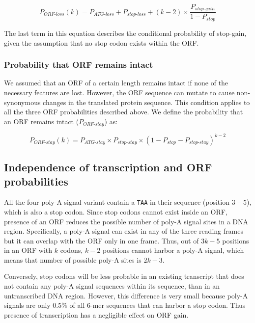 \documentclass[12pt,a4paper]{article}
\begin{document}
\begin{equation}
P_\textit{ORF-loss}(k) = P_\textit{ATG-loss} + P_\textit{stop-loss} + (k-2)\times \frac{P_\textit{stop-gain}}{1-P_\textit{stop}}
\label{eqorfloss}
\end{equation}

The last term in this equation describes the conditional probability of stop-gain, given the assumption that no stop codon exists within the ORF.

\subsubsection{Probability that ORF remains intact}

We assumed that an ORF of a certain length remains intact if none of the necessary features are lost. However, the ORF sequence can mutate to cause non-synonymous changes in the translated protein sequence. This condition applies to all the three ORF probabilities described above. We define the probability that an ORF remains intact ($P_\textit{ORF-stay}$) as:

\begin{equation}
P_\textit{ORF-stay}(k) = P_\textit{ATG-stay} \times P_\textit{stop-stay} \times (1 - P_\textit{stop} - P_\textit{stop-stay})^{k-2}
\label{eqorfstay}
\end{equation}

\subsection{Independence of transcription and ORF probabilities}

\label{rnaorfindependence}

All the four poly-A signal variant contain a \texttt{TAA} in their sequence (position 3 -- 5), which is also a stop codon. Since stop codons cannot exist inside an ORF, presence of an ORF reduces the possible number of poly-A signal sites in a DNA region. Specifically, a poly-A signal can exist in any of the three reading frames but it can overlap with the ORF only in one frame. Thus, out of $3k-5$ positions in an ORF with $k$ codons, $k-2$ positions cannot harbor a poly-A signal, which means that number of possible poly-A sites is $2k-3$.

Conversely, stop codons will be less probable in an existing transcript that does not contain any poly-A signal sequences within its sequence, than in an untranscribed DNA region. However, this difference is very small because poly-A signals are only 0.5\% of all 6-mer sequences that can harbor a stop codon. Thus presence of transcription has a negligible effect on ORF gain.
\end{document}
